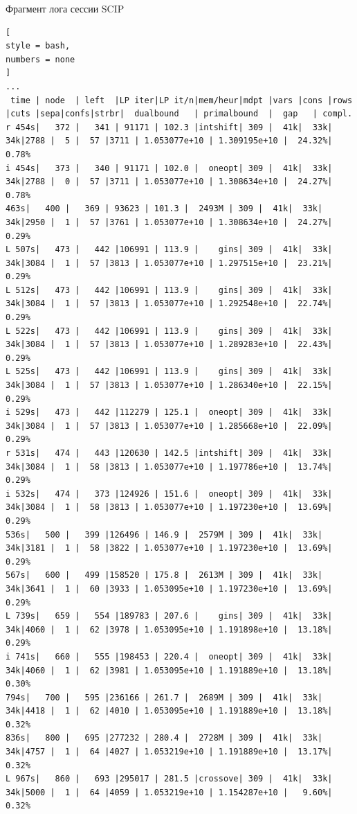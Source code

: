 \documentclass[%
	11pt,
	a4paper,
	utf8,
		]{article}
\begin{document}
Фрагмент лога сессии SCIP
\begin{lstlisting}[
style = bash,
numbers = none
]
...
 time | node  | left  |LP iter|LP it/n|mem/heur|mdpt |vars |cons |rows |cuts |sepa|confs|strbr|  dualbound   | primalbound  |  gap   | compl. 
r 454s|   372 |   341 | 91171 | 102.3 |intshift| 309 |  41k|  33k|  34k|2788 |  5 |  57 |3711 | 1.053077e+10 | 1.309195e+10 |  24.32%|   0.78%
i 454s|   373 |   340 | 91171 | 102.0 |  oneopt| 309 |  41k|  33k|  34k|2788 |  0 |  57 |3711 | 1.053077e+10 | 1.308634e+10 |  24.27%|   0.78%
463s|   400 |   369 | 93623 | 101.3 |  2493M | 309 |  41k|  33k|  34k|2950 |  1 |  57 |3761 | 1.053077e+10 | 1.308634e+10 |  24.27%|   0.29%
L 507s|   473 |   442 |106991 | 113.9 |    gins| 309 |  41k|  33k|  34k|3084 |  1 |  57 |3813 | 1.053077e+10 | 1.297515e+10 |  23.21%|   0.29%
L 512s|   473 |   442 |106991 | 113.9 |    gins| 309 |  41k|  33k|  34k|3084 |  1 |  57 |3813 | 1.053077e+10 | 1.292548e+10 |  22.74%|   0.29%
L 522s|   473 |   442 |106991 | 113.9 |    gins| 309 |  41k|  33k|  34k|3084 |  1 |  57 |3813 | 1.053077e+10 | 1.289283e+10 |  22.43%|   0.29%
L 525s|   473 |   442 |106991 | 113.9 |    gins| 309 |  41k|  33k|  34k|3084 |  1 |  57 |3813 | 1.053077e+10 | 1.286340e+10 |  22.15%|   0.29%
i 529s|   473 |   442 |112279 | 125.1 |  oneopt| 309 |  41k|  33k|  34k|3084 |  1 |  57 |3813 | 1.053077e+10 | 1.285668e+10 |  22.09%|   0.29%
r 531s|   474 |   443 |120630 | 142.5 |intshift| 309 |  41k|  33k|  34k|3084 |  1 |  58 |3813 | 1.053077e+10 | 1.197786e+10 |  13.74%|   0.29%
i 532s|   474 |   373 |124926 | 151.6 |  oneopt| 309 |  41k|  33k|  34k|3084 |  1 |  58 |3813 | 1.053077e+10 | 1.197230e+10 |  13.69%|   0.29%
536s|   500 |   399 |126496 | 146.9 |  2579M | 309 |  41k|  33k|  34k|3181 |  1 |  58 |3822 | 1.053077e+10 | 1.197230e+10 |  13.69%|   0.29%
567s|   600 |   499 |158520 | 175.8 |  2613M | 309 |  41k|  33k|  34k|3641 |  1 |  60 |3933 | 1.053095e+10 | 1.197230e+10 |  13.69%|   0.29%
L 739s|   659 |   554 |189783 | 207.6 |    gins| 309 |  41k|  33k|  34k|4060 |  1 |  62 |3978 | 1.053095e+10 | 1.191898e+10 |  13.18%|   0.29%
i 741s|   660 |   555 |198453 | 220.4 |  oneopt| 309 |  41k|  33k|  34k|4060 |  1 |  62 |3981 | 1.053095e+10 | 1.191889e+10 |  13.18%|   0.30%
794s|   700 |   595 |236166 | 261.7 |  2689M | 309 |  41k|  33k|  34k|4418 |  1 |  62 |4010 | 1.053095e+10 | 1.191889e+10 |  13.18%|   0.32%
836s|   800 |   695 |277232 | 280.4 |  2728M | 309 |  41k|  33k|  34k|4757 |  1 |  64 |4027 | 1.053219e+10 | 1.191889e+10 |  13.17%|   0.32%
L 967s|   860 |   693 |295017 | 281.5 |crossove| 309 |  41k|  33k|  34k|5000 |  1 |  64 |4059 | 1.053219e+10 | 1.154287e+10 |   9.60%|   0.32%

\end{lstlisting}
\end{document}
